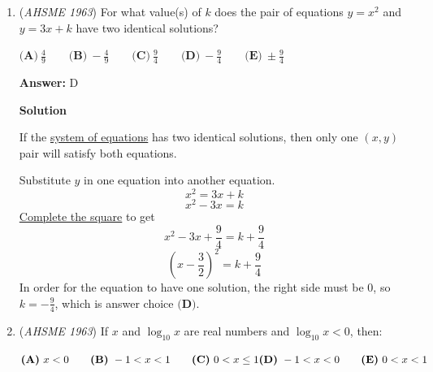 \begin{enumerate}
 When $x = 0$:
 \[x + 1 = 1\]
 \[x - 1 = -1\]

 Invalid.

 When $x = 1$:
 \[x + 1 = 2\]
 \[x - 1 = 0\]

 Invalid.

 When $x = -1$:
 \[x + 1 = 0\]
 \[x - 1 = -2\]

 Invalid.

 When $x = -1$ or $x = 1$:

 We have already tested both these cases above, and we know that neither satisfy the statement.

 Therefore, none of the answer choices above is the value of $x$. Therefore, the answer is $\boxed{\text{E}}$.

 


	\item (\textit{AHSME 1963}) For what value(s) of $k$ does the pair of equations $y=x^2$ and $y=3x+k$ have two identical solutions?


 $\textbf{(A)}\ \frac{4}{9}\qquad \textbf{(B)}\ -\frac{4}{9}\qquad \textbf{(C)}\ \frac{9}{4}\qquad \textbf{(D)}\ -\frac{9}{4}\qquad \textbf{(E)}\ \pm\frac{9}{4}$

 \textbf{Answer: }D



\textbf{Solution}

If the \href{https://artofproblemsolving.com/wiki/index.php?title=System\_of\_equations}{system of equations} has two identical solutions, then only one $(x,y)$ pair will satisfy both equations.

 Substitute $y$ in one equation into another equation.
 \[x^2 = 3x + k\]
 \[x^2 - 3x = k\]\href{https://artofproblemsolving.com/wiki/index.php?title=Complete\_the\_square}{Complete the square} to get
 \[x^2 - 3x + \frac{9}{4} = k + \frac{9}{4}\]
 \[(x - \frac{3}{2})^2 = k + \frac{9}{4}\]In order for the equation to have one solution, the right side must be $0$, so $k = -\frac{9}{4}$, which is answer choice $\boxed{\textbf{(D)}}$.

 


 


	\item (\textit{AHSME 1963}) If $x$ and $\log_{10} x$ are real numbers and $\log_{10} x<0$, then:


 $\textbf{(A)}\ x<0 \qquad \textbf{(B)}\ -1<x<1 \qquad \textbf{(C)}\ 0<x\le 1 \\ \textbf{(D)}\ -1<x<0 \qquad \textbf{(E)}\ 0<x<1$


\end{enumerate}
